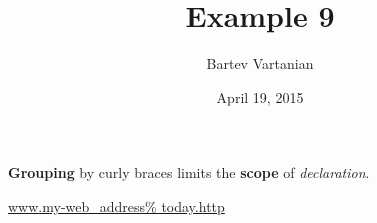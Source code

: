 \documentclass{article}
\newcommand{\keyword}[2][\bfseries]{{#1#2}}
\begin{document}
\title{Example 9}
\author{Bartev Vartanian}
\date{April 19, 2015}

\maketitle

\keyword{Grouping} by curly braces limits the  \keyword{scope}
of \keyword[\itshape]{declaration}.

\url{www.my-web_address% today.http}
\end{document}
